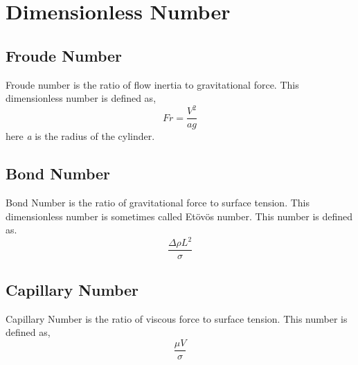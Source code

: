 \documentclass[]{jsarticle}
\begin{document}
\section{Dimensionless Number}
\subsection{Froude Number}
Froude number is the ratio of flow inertia to gravitational force. This dimensionless number is defined as,
\begin{equation}
Fr=\frac{V^2}{ag}
\end{equation}
here \textit{a} is the radius of the cylinder.
\label{subsec:label}
\subsection{Bond Number}
Bond Number is the ratio of gravitational force to surface tension. This dimensionless number is sometimes called Et\"{o}v\"{o}s number. This number is defined as.
\begin{equation}
\frac{\Delta \rho L^2}{\sigma}
\end{equation}
\label{subsec:label}

\subsection{Capillary Number}
Capillary Number is the ratio of viscous force to surface tension. This number is defined as,
\begin{equation}
\frac{\mu V}{\sigma}
\end{equation}
\label{subsec:label}




\label{sec:label}
\end{document}
